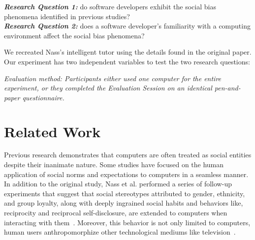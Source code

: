 \documentclass{sig-alternate-05-2015}
\begin{document}
\noindent \textbf{\emph{Research Question 1:}} do software developers exhibit the social bias phenomena identified in previous studies?\\

\noindent \textbf{\emph{Research Question 2:}} does a software developer's familiarity with a computing environment affect the social bias phenomena?\\

We recreated Nass's intelligent tutor using the details found in the original paper. Our experiment has two independent variables to test the two research questions:\\
\begin{enumerate*}
    \item{\emph{Evaluation method: Participants either used one computer for the entire experiment, or they completed the Evaluation Session on an identical pen-and-paper questionnaire.}}
\end{enumerate*}

\section{Related Work}
Previous research demonstrates that computers are often treated as social entities despite their inanimate nature. Some studies have focused on the human application of social norms and expectations to computers in a seamless manner. In addition to the original study, Nass et al. performed a series of follow-up experiments that suggest that social stereotypes attributed to gender, ethnicity, and group loyalty, along with deeply ingrained social habits and behaviors like, reciprocity and reciprocal self-disclosure, are extended to computers when interacting with them~\cite{Nass2000machines,nass1999people}. Moreover, this behavior is not only limited to computers, human users anthropomorphize other technological mediums like television~\cite{reeves1996people}.
\end{document}
